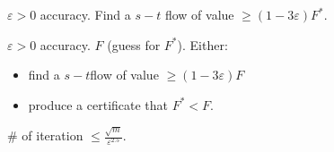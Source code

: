 \begin{theorem}
    $\varepsilon > 0$ accuracy. Find a $s-t$ flow of value $\geqslant (1-3\varepsilon) F^*$.
\end{theorem}


\begin{theorem}
    $\varepsilon > 0$ accuracy. $F$ (guess for $F^*$). Either:
    \begin{itemize}
        \item find a $s-t$flow of value $\geqslant (1-3\varepsilon)F$
        \item produce a certificate that $F^* < F$.
    \end{itemize}
    
    \# of iteration $\leqslant \frac{\sqrt{m}}{\varepsilon^{2.5}}$.
\end{theorem}







